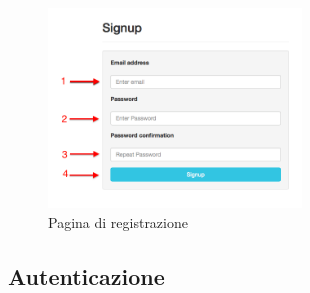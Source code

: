 \begin{enumerate}
			\begin{figure}[H]
				\centering \includegraphics[width=0.6\textwidth]{img/signup.png}
			\caption{ \label{fig:signUp} Pagina di registrazione}
			\end{figure}

		\end{enumerate}

	\clearpage
	\subsection{Autenticazione}
		\label{autenticazione}

